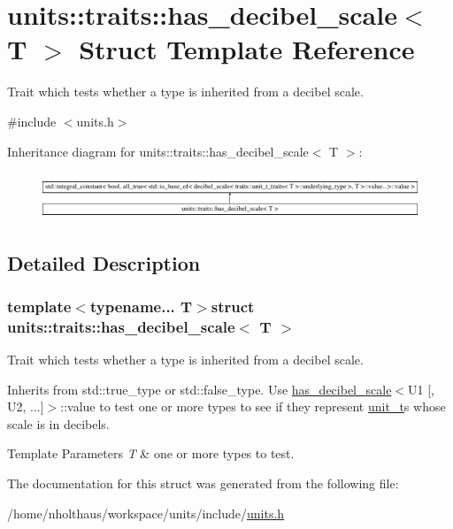 \hypertarget{structunits_1_1traits_1_1has__decibel__scale}{}\section{units\+:\+:traits\+:\+:has\+\_\+decibel\+\_\+scale$<$ T $>$ Struct Template Reference}
\label{structunits_1_1traits_1_1has__decibel__scale}


Trait which tests whether a type is inherited from a decibel scale.  




{\ttfamily \#include $<$units.\+h$>$}

Inheritance diagram for units\+:\+:traits\+:\+:has\+\_\+decibel\+\_\+scale$<$ T $>$\+:\begin{figure}[H]
\begin{center}
\leavevmode
\includegraphics[height=1.414141cm]{structunits_1_1traits_1_1has__decibel__scale}
\end{center}
\end{figure}


\subsection{Detailed Description}
\subsubsection*{template$<$typename... T$>$struct units\+::traits\+::has\+\_\+decibel\+\_\+scale$<$ T $>$}

Trait which tests whether a type is inherited from a decibel scale. 

Inherits from {\ttfamily std\+::true\+\_\+type} or {\ttfamily std\+::false\+\_\+type}. Use {\ttfamily \hyperlink{structunits_1_1traits_1_1has__decibel__scale}{has\+\_\+decibel\+\_\+scale}$<$U1 \mbox{[}, U2, ...\mbox{]}$>$\+::value} to test one or more types to see if they represent \hyperlink{classunits_1_1unit__t}{unit\+\_\+t}\textquotesingle{}s whose scale is in decibels. 
\begin{DoxyTemplParams}{Template Parameters}
{\em T} & one or more types to test. \\
\hline
\end{DoxyTemplParams}


The documentation for this struct was generated from the following file\+:\begin{DoxyCompactItemize}
\item 
/home/nholthaus/workspace/units/include/\hyperlink{units_8h}{units.\+h}\end{DoxyCompactItemize}
